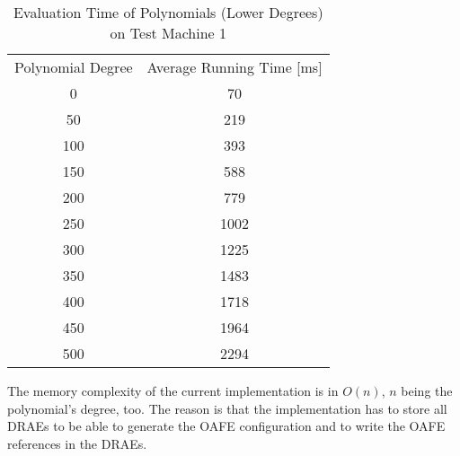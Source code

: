 \begin{table}[ht]
  \centering
  \begin{tabular}{|c|c|}
    Polynomial Degree & Average Running Time [ms] \\
      0 &   70 \\
     50 &  219 \\
    100 &  393 \\
    150 &  588 \\
    200 &  779 \\
    250 & 1002 \\
    300 & 1225 \\
    350 & 1483 \\
    400 & 1718 \\
    450 & 1964 \\
    500 & 2294 \\
  \end{tabular}
  \caption{Evaluation Time of Polynomials (Lower Degrees) on Test Machine 1}
  \label{tab:poly-deg-t-small}
\end{table}


%
%
\label{sec:mem-complexity}

The memory complexity of the current implementation is in $O(n)$, $n$ being the
polynomial's degree, too. The reason is that the implementation has to store all
DRAEs to be able to generate the OAFE configuration and to write the OAFE
references in the DRAEs.

